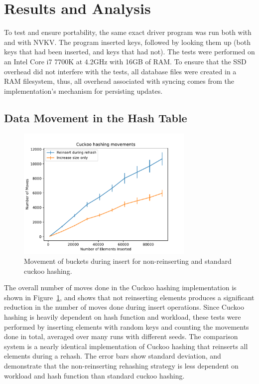 \section{Results and Analysis}

To test and ensure portability, the same exact driver program was run both with
\bdb and with NVKV. The program inserted keys, followed by looking them up (both
keys that had been inserted, and keys that had not). The tests were performed on
an Intel Core i7 7700K at 4.2GHz with 16GB of RAM. To ensure that the SSD
overhead did not interfere with the tests, all database files were created in a
RAM filesystem, thus, all overhead associated with syncing comes from the
implementation's mechanism for persisting updates.

\subsection{Data Movement in the Hash Table}

\begin{figure}
\centering
\hspace*{-0.3in}
\includegraphics[width=85mm]{fig/moves}
\caption{Movement of buckets during insert for non-reinserting and standard
cuckoo hashing.}
\label{fig:moves}
\end{figure}

The overall number of moves done in the Cuckoo hashing implementation is shown
in Figure~\ref{fig:moves}, and shows that not reinserting elements produces a
significant reduction in the number of moves done during insert operations.
Since Cuckoo hashing is heavily dependent on hash function and workload, these
tests were performed by inserting elements with random keys and counting the
movements done in total, averaged over many runs with different seeds.
The comparison system is a nearly identical
implementation of Cuckoo hashing that reinserts all elements during a rehash.
The error bars show standard deviation, and demonstrate that the non-reinserting
rehashing strategy is less dependent on workload and hash function than standard
cuckoo hashing.

